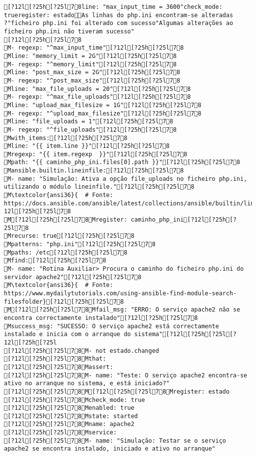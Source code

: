 \documentclass{scrartcl}
\begin{document}
\begin{Verbatim}
[?12l[?25h[?25l78line: "max_input_time = 3600"check_mode: trueregister: estadoAs linhas do php.ini encontram-se alteradas ?"ficheiro php.ini foi alterado com sucesso"Algumas alterações ao ficheiro php.ini não tiveram sucesso"
[?12l[?25h[?25l78
M- regexp: "^max_input_time"[?12l[?25h[?25l78
Mline: "memory_limit = 2G"[?12l[?25h[?25l78
M- regexp: "^memory_limit"[?12l[?25h[?25l78
Mline: "post_max_size = 2G"[?12l[?25h[?25l78
M- regexp: "^post_max_size"[?12l[?25h[?25l78
Mline: "max_file_uploads = 20"[?12l[?25h[?25l78
M- regexp: "^max_file_uploads"[?12l[?25h[?25l78
Mline: "upload_max_filesize = 1G"[?12l[?25h[?25l78
M- regexp: "^upload_max_filesize"[?12l[?25h[?25l78
Mline: "file_uploads = 1"[?12l[?25h[?25l78
M- regexp: "^file_uploads"[?12l[?25h[?25l78
Mwith_items:[?12l[?25h[?25l78
Mline: "{{ item.line }}"[?12l[?25h[?25l78
Mregexp: "{{ item.regexp  }}"[?12l[?25h[?25l78
Mpath: "{{ caminho_php_ini.files[0].path }}"[?12l[?25h[?25l78
Mansible.builtin.lineinfile:[?12l[?25h[?25l78
M- name: "Simulação: Ativa a opção file_uploads no ficheiro php.ini, utilizando o módulo lineinfile."[?12l[?25h[?25l78
M\textcolor{ansi36}{  # Fonte: https://docs.ansible.com/ansible/latest/collections/ansible/builtin/lineinfile_module.html}[?12l[?25h[?25l78
M[?12l[?25h[?25l78Mregister: caminho_php_ini[?12l[?25h[?25l78
Mrecurse: true[?12l[?25h[?25l78
Mpatterns: "php.ini"[?12l[?25h[?25l78
Mpaths: /etc[?12l[?25h[?25l78
Mfind:[?12l[?25h[?25l78
M- name: "Rotina Auxiliar> Procura o caminho do ficheiro php.ini do servidor apache2"[?12l[?25h[?25l78
M\textcolor{ansi36}{  # Fonte: https://www.mydailytutorials.com/using-ansible-find-module-search-filesfolder}[?12l[?25h[?25l78
M[?12l[?25h[?25l78Mfail_msg: "ERRO: O serviço apache2 não se encontra correctamente instalado"[?12l[?25h[?25l78
Msuccess_msg: "SUCESSO: O serviço apache2 está correctamente instalado e inicia com o arranque do sistema"[?12l[?25h[?25l[?12l[?25h[?25l
[?12l[?25h[?25l78M- not estado.changed
[?12l[?25h[?25l78Mthat:
[?12l[?25h[?25l78Massert:
[?12l[?25h[?25l78M- name: "Teste: O serviço apache2 encontra-se ativo no arranque no sistema, e está iniciado?"
[?12l[?25h[?25l78M[?12l[?25h[?25l78Mregister: estado
[?12l[?25h[?25l78Mcheck_mode: true
[?12l[?25h[?25l78Menabled: true
[?12l[?25h[?25l78Mstate: started
[?12l[?25h[?25l78Mname: apache2
[?12l[?25h[?25l78Mservice:
[?12l[?25h[?25l78M- name: "Simulação: Testar se o serviço apache2 se encontra instalado, iniciado e ativo no arranque"

\end{Verbatim}
\end{document}
